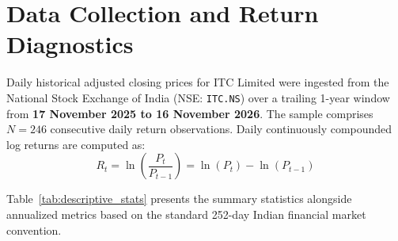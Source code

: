 
\section{Data Collection and Return Diagnostics}
\label{sec:return_diagnostics}

Daily historical adjusted closing prices for ITC Limited were ingested from the National Stock Exchange of India (NSE: \texttt{ITC.NS}) over a trailing 1-year window from \textbf{17 November 2025 to 16 November 2026}. The sample comprises $N = 246$ consecutive daily return observations. Daily continuously compounded log returns are computed as:
\begin{equation}
R_t = \ln\left(\frac{P_t}{P_{t-1}}\right) = \ln(P_t) - \ln(P_{t-1})
\label{eq:log_return}
\end{equation}

Table~\ref{tab:descriptive_stats} presents the summary statistics alongside annualized metrics based on the standard 252-day Indian financial market convention.

